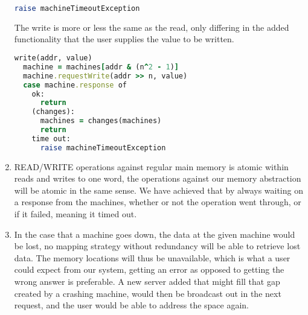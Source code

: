 \documentclass[a4paper]{article}
\begin{document}
\begin{enumerate}
\begin{lstlisting}[language=Ruby, caption={READ}]
      raise machineTimeoutException
    \end{lstlisting}
    The write is more or less the same as the read, only differing in the added functionality that the user supplies the value to be written.
    \begin{lstlisting}[language=Ruby, caption={WRITE}]
write(addr, value)
  machine = machines[addr & (n^2 - 1)]
  machine.requestWrite(addr >> n, value)
  case machine.response of
    ok:
      return
    (changes):
      machines = changes(machines)
      return
    time out:
      raise machineTimeoutException
    \end{lstlisting}
  \item
    READ/WRITE operations against regular main memory is atomic within reads and writes to one word, the operations against our memory abstraction will be atomic in the same sense. We have achieved that by always waiting on a response from the machines, whether or not the operation went through, or if it failed, meaning it timed out.
  \item
    In the case that a machine goes down, the data at the given machine would be lost, no mapping strategy without redundancy will be able to retrieve lost data. The memory locations will thus be unavailable, which is what a user could expect from our system, getting an error as opposed to getting the wrong answer is preferable. A new server added that might fill that gap created by a crashing machine, would then be broadcast out in the next request, and the user would be able to address the space again.
\end{enumerate}
\end{document}
